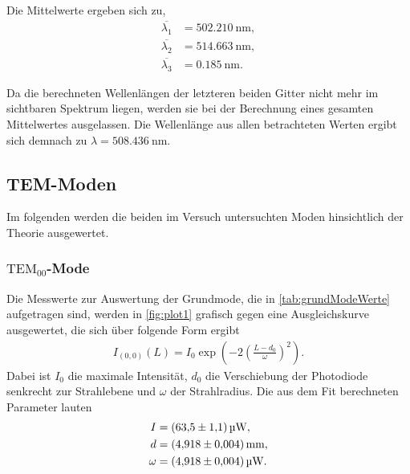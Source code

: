 \noindent
Die Mittelwerte ergeben sich zu,
\begin{align*}
  \overline{\lambda_1} &= \SI{502.210}{\nano\meter}, \\
  \overline{\lambda_2} &= \SI{514.663}{\nano\meter}, \\
  \overline{\lambda_3} &= \SI{0.185}{\nano\meter}.
\end{align*}

\noindent
Da die berechneten Wellenlängen der letzteren beiden Gitter nicht mehr im sichtbaren Spektrum liegen, werden sie bei der Berechnung eines gesamten Mittelwertes ausgelassen. Die Wellenlänge aus allen betrachteten Werten
ergibt sich demnach zu $\lambda=\SI{508.436}{\nano\meter}$.

\subsection{TEM-Moden}
\label{subsec:TEM}
Im folgenden werden die beiden im Versuch untersuchten Moden hinsichtlich der Theorie ausgewertet.

\subsubsection{$\text{TEM}_{00}$-Mode}
\label{subsubsec:grundmode}
Die Messwerte zur Auswertung der Grundmode, die in \autoref{tab:grundModeWerte} aufgetragen sind, werden in \autoref{fig:plot1} grafisch gegen eine Ausgleichskurve ausgewertet, die sich über folgende Form ergibt
\begin{align}
  I_{(0,0)}(L)=I_0\exp\left({-2\left(\frac{L-d_0}{\omega}\right)^2}\right).
\end{align}
Dabei ist $I_0$ die maximale Intensität, $d_0$ die Verschiebung der Photodiode senkrecht zur Strahlebene und $\omega$ der Strahlradius.
Die aus dem Fit berechneten Parameter lauten
\begin{align*}
  I &= \SI{63.5 \pm 1.1}{\micro\watt}, \\
  d &= \SI{4.918 \pm 0.004}{\milli\meter}, \\
  \omega &= \SI{4.918 \pm 0.004}{\micro\watt}.
\end{align*}

